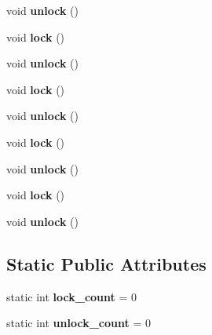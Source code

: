 \begin{DoxyCompactItemize}
\item 
\mbox{\label{structmutex_a362d78bead80c2899d89444380cab1bd}} 
void {\bfseries unlock} ()
\item 
\mbox{\label{structmutex_a760ba333c299e9b27730051c4c794f50}} 
void {\bfseries lock} ()
\item 
\mbox{\label{structmutex_a362d78bead80c2899d89444380cab1bd}} 
void {\bfseries unlock} ()
\item 
\mbox{\label{structmutex_a760ba333c299e9b27730051c4c794f50}} 
void {\bfseries lock} ()
\item 
\mbox{\label{structmutex_a362d78bead80c2899d89444380cab1bd}} 
void {\bfseries unlock} ()
\item 
\mbox{\label{structmutex_a760ba333c299e9b27730051c4c794f50}} 
void {\bfseries lock} ()
\item 
\mbox{\label{structmutex_a362d78bead80c2899d89444380cab1bd}} 
void {\bfseries unlock} ()
\item 
\mbox{\label{structmutex_a760ba333c299e9b27730051c4c794f50}} 
void {\bfseries lock} ()
\item 
\mbox{\label{structmutex_a362d78bead80c2899d89444380cab1bd}} 
void {\bfseries unlock} ()
\end{DoxyCompactItemize}
\subsection*{Static Public Attributes}
\begin{DoxyCompactItemize}
\item 
\mbox{\label{structmutex_a5fd049d560d1999aaa9de5db946b73dd}} 
static int {\bfseries lock\+\_\+count} = 0
\item 
\mbox{\label{structmutex_a970183aaaaaa7b1f70e54263d3072466}} 
static int {\bfseries unlock\+\_\+count} = 0
\end{DoxyCompactItemize}


